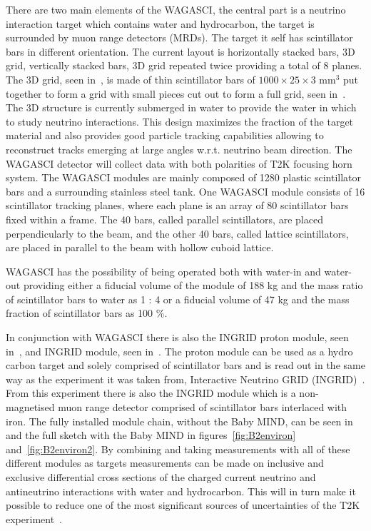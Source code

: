 There are two main elements of the WAGASCI, the central part is a neutrino interaction target which contains water and hydrocarbon, the target is surrounded by muon range detectors (MRDs). The target it self has scintillator bars in different orientation. The current layout is horizontally stacked bars, 3D grid, vertically stacked bars, 3D grid repeated twice providing a total of 8 planes. The 3D grid, seen in~, is made of thin scintillator bars of $1000\times25\times3$ mm$^3$ put together to form a grid with small pieces cut out to form a full grid, seen in~. The 3D structure is currently submerged in water to provide the water in which to study neutrino interactions. This design maximizes the fraction of the target material and also provides good particle tracking capabilities allowing to reconstruct tracks emerging at large angles w.r.t. neutrino beam direction. The WAGASCI detector will collect data with both polarities of T2K focusing horn system. The WAGASCI modules are mainly composed of 1280 plastic scintillator bars and a surrounding stainless steel tank. One WAGASCI module consists of 16 scintillator tracking planes, where each plane is an array of 80 scintillator bars fixed within a frame.
The 40 bars, called parallel scintillators, are placed perpendicularly to the beam, and the other 40 bars, called lattice scintillators, are placed in parallel to the beam with hollow cuboid lattice.

WAGASCI has the possibility of being operated both with water-in and water-out providing either a fiducial volume of the module of 188 kg and the mass ratio of scintillator bars to water as 1 : 4 or a fiducial volume of 47 kg and the mass fraction of scintillator bars as 100 \%.

In conjunction with WAGASCI there is also the INGRID proton module, seen in~, and INGRID module, seen in~. The proton module can be used as a hydro carbon target and solely comprised of scintillator bars and is read out in the same way as the experiment it was taken from, Interactive Neutrino GRID (INGRID)~\cite{85INGRID}. From this experiment there is also the INGRID module which is a non-magnetised muon range detector comprised of scintillator bars interlaced with iron. The fully installed module chain, without the Baby MIND, can be seen in~ and the full sketch with the Baby MIND in figures~\ref{fig:B2environ} and~\ref{fig:B2environ2}. By combining and taking measurements with all of these different modules as targets measurements can be made on  inclusive and exclusive differential cross sections of the charged current neutrino and antineutrino interactions with water and hydrocarbon. This will in turn make it possible to reduce  one of the most significant sources of uncertainties of the T2K experiment~\cite{21T2K}.

